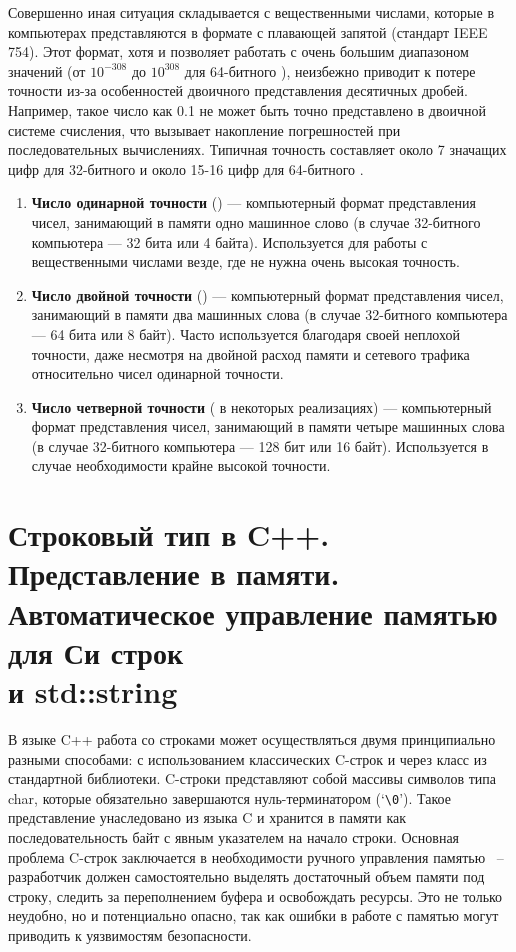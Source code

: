 Совершенно иная ситуация складывается с вещественными числами, которые в компьютерах представляются в формате с плавающей запятой (стандарт IEEE 754). Этот формат, хотя и 
позволяет работать с очень большим диапазоном значений (от $10^{-308}$ до $10^{308}$ для 64-битного ), неизбежно приводит к потере точности из-за особенностей 
двоичного представления десятичных дробей. Например, такое число как 0.1 не может быть точно представлено в двоичной системе счисления, что вызывает накопление 
погрешностей при последовательных вычислениях. Типичная точность составляет около 7 значащих цифр для 32-битного
 и около 15-16 цифр для 64-битного .
\begin{enumerate}
    \item \textbf{Число одинарной точности} () --- компьютерный формат представления чисел, занимающий в памяти одно машинное слово (в случае 32-битного 
          компьютера — 32 бита или 
          4 байта). Используется для работы с вещественными числами везде, где не нужна очень высокая точность.
    \item \textbf{Число двойной точности} () --- компьютерный формат представления чисел, занимающий в памяти два машинных слова
          (в случае 32-битного компьютера — 64 бита или 8 байт). Часто используется благодаря своей неплохой точности,
          даже несмотря на двойной расход памяти и сетевого трафика относительно чисел одинарной точности.
    \item \textbf{Число четверной точности} ( в некоторых реализациях) --- компьютерный формат представления чисел, занимающий в памяти четыре 
          машинных слова (в случае 32-битного компьютера — 128 бит или 16 байт). Используется в случае необходимости крайне высокой точности.
\end{enumerate}


\section{Строковый тип в C++. Представление в памяти.\\ Автоматическое управление памятью для Си строк\\ и std::string}
В языке C++ работа со строками может осуществляться двумя принципиально разными способами: с использованием классических C-строк и через класс  из 
стандартной библиотеки. C-строки представляют собой массивы символов типа char, которые обязательно завершаются нуль-терминатором (`\verb|\0|'). Такое представление унаследовано из 
языка C и хранится в памяти как последовательность байт с явным указателем на начало строки. Основная проблема C-строк заключается в необходимости ручного управления памятью
~-- разработчик должен самостоятельно выделять достаточный объем памяти под строку, следить за переполнением буфера и освобождать ресурсы. Это не только неудобно, но и 
потенциально опасно, так как ошибки в работе с памятью могут приводить к уязвимостям безопасности.

